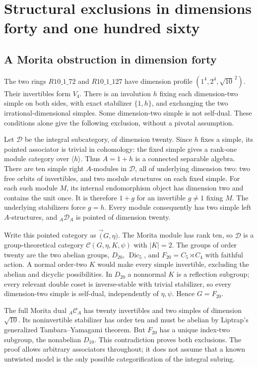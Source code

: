 \section{Structural exclusions in dimensions forty and one hundred sixty}
\subsection{A Morita obstruction in dimension forty}
The two rings $R10\_1\_72$ and $R10\_1\_127$ have dimension profile
$(1^4,2^4,\sqrt{10}^{\,2})$. Their invertibles form $V_4$. There is an
involution $h$ fixing each dimension-two simple on both sides, with exact
stabilizer $\{1,h\}$, and exchanging the two irrational-dimensional simples.
Some dimension-two simple is not self-dual. These conditions alone give
the following exclusion, without a pivotal assumption.

Let $\mathcal D$ be the integral subcategory, of dimension twenty.
Since $h$ fixes a simple, its pointed associator is trivial in cohomology:
the fixed simple gives a rank-one module category over $\langle h\rangle$.
Thus $A=1+h$ is a connected separable algebra. There are ten simple right
$A$-modules in $\mathcal D$, all of underlying dimension two: two free
orbits of invertibles, and two module structures on each fixed simple.
For each such module $M$, its internal endomorphism object has dimension
two and contains the unit once. It is therefore $1+g$ for an invertible
$g\ne1$ fixing $M$. The underlying stabilizers force $g=h$.
Every module consequently has two simple left $A$-structures, and
$ {}_A\mathcal D_A$ is pointed of dimension twenty.

Write this pointed category as $\Vec(G,\eta)$. The Morita module has
rank ten, so $\mathcal D$ is a group-theoretical category
$\mathcal C(G,\eta,K,\psi)$ with $|K|=2$. The groups of order twenty
are the two abelian groups, $D_{20}$, $\operatorname{Dic}_5$, and
$F_{20}=C_5\rtimes C_4$ with faithful action. A normal order-two $K$
would make every simple invertible, excluding the abelian and dicyclic
possibilities. In $D_{20}$ a nonnormal $K$ is a reflection subgroup;
every relevant double coset is inverse-stable with trivial stabilizer,
so every dimension-two simple is self-dual, independently of $\eta,\psi$.
Hence $G=F_{20}$.

The full Morita dual $ {}_A\mathcal C_A$ has twenty invertibles and two
simples of dimension $\sqrt{10}$. Its noninvertible stabilizer has order
ten and must be abelian by Liptrap's generalized Tambara--Yamagami theorem.
But $F_{20}$ has a unique index-two subgroup, the nonabelian $D_{10}$.
This contradiction proves both exclusions. The proof allows arbitrary
associators throughout; it does not assume that a known untwisted model
is the only possible categorification of the integral subring.

